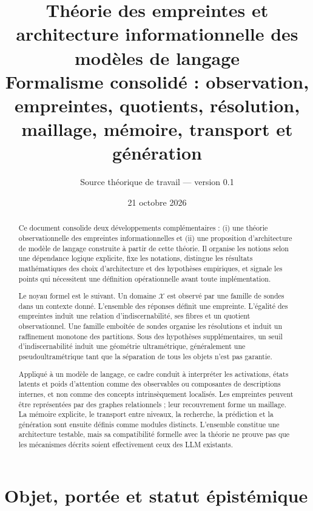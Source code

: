 \documentclass[11pt,a4paper]{article}
\title{\textbf{Théorie des empreintes et architecture informationnelle des modèles de langage}\\[0.35em]
\large Formalisme consolidé : observation, empreintes, quotients, résolution, maillage, mémoire, transport et génération}
\author{Source théorique de travail — version 0.1}
\date{21 octobre 2026}
\theoremstyle{remark}
\newcommand{\X}{\mathcal X}
\newcommand{\1}{\mathbf 1}
\begin{document}
\maketitle

\begin{abstract}
Ce document consolide deux développements complémentaires : (i) une théorie observationnelle des empreintes informationnelles et (ii) une proposition d'architecture de modèle de langage construite à partir de cette théorie. Il organise les notions selon une dépendance logique explicite, fixe les notations, distingue les résultats mathématiques des choix d'architecture et des hypothèses empiriques, et signale les points qui nécessitent une définition opérationnelle avant toute implémentation.

Le noyau formel est le suivant. Un domaine $\X$ est observé par une famille de sondes dans un contexte donné. L'ensemble des réponses définit une empreinte. L'égalité des empreintes induit une relation d'indiscernabilité, ses fibres et un quotient observationnel. Une famille emboîtée de sondes organise les résolutions et induit un raffinement monotone des partitions. Sous des hypothèses supplémentaires, un seuil d'indiscernabilité induit une géométrie ultramétrique, généralement une pseudoultramétrique tant que la séparation de tous les objets n'est pas garantie.

Appliqué à un modèle de langage, ce cadre conduit à interpréter les activations, états latents et poids d'attention comme des observables ou composantes de descriptions internes, et non comme des concepts intrinsèquement localisés. Les empreintes peuvent être représentées par des graphes relationnels ; leur recouvrement forme un maillage. La mémoire explicite, le transport entre niveaux, la recherche, la prédiction et la génération sont ensuite définis comme modules distincts. L'ensemble constitue une architecture testable, mais sa compatibilité formelle avec la théorie ne prouve pas que les mécanismes décrits soient effectivement ceux des LLM existants.
\end{abstract}

\clearpage
\tableofcontents
\clearpage

\section{Objet, portée et statut épistémique}
\end{document}
